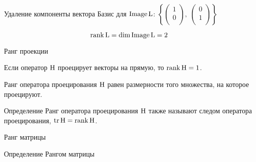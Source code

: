 \begin{frame}{Удаление компоненты вектора}
\pause 
Базис для $\operatorname{Image} \operatorname{L}$: $\left\{\begin{pmatrix}
1 \\
0 \\
\end{pmatrix}, \;
\begin{pmatrix}
0 \\
1 \\
\end{pmatrix} \right\}$

\[
\rank \operatorname{L} = \dim \operatorname{Image} \operatorname{L} = 2    
\]

\end{frame}

\begin{frame}{Ранг проекции}

Если оператор $\mathrm{H}$ проецирует векторы на прямую, то $\rank \mathrm{H} = 1$.

\pause

Ранг оператора проецирования $\mathrm{H}$ равен размерности того множества, на которое проецируют.

\pause

\begin{block}{Определение}
Ранг оператора проецирования $\mathrm{H}$ также называют \alert{следом оператора проецирования},
$\trace \HH = \rank \HH$.
\end{block}


\end{frame}


\begin{frame}{Ранг матрицы}

\begin{block}{Определение}
\alert{Рангом матрицы} 
\end{block}


\end{frame}